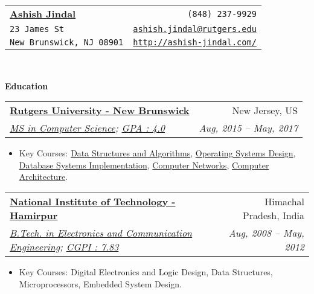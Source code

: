 \documentclass[letterpaper,11pt]{article}
\makeatletter
\newcommand{\resitem}[1]{\item #1 \vspace{2pt}}
\newcommand{\resheading}[1]{{\large \colorbox{mygrey}{\begin{minipage}{\textwidth}{\textbf{#1 \vphantom{p\^{E}}}}\end{minipage}}}\vspace{6pt}}
\newcommand{\ressubheading}[4]{
\begin{tabular*}{7in}{l@{\extracolsep{\fill}}r}
		\textbf{#1} & #2 \\
		\textit{#3} & \textit{#4} \\
\end{tabular*}\vspace{-3pt}}
\makeatother
\begin{document}
\newcommand{\mywebheader}{
\begin{tabular*}{7in}{l@{\extracolsep{\fill}}r}
	\textbf{\href{http://www.ashish-jindal.com/}{\LARGE Ashish Jindal}} & {\footnotesize \texttt{(848) 237-9929}}\\
	{\footnotesize \texttt{23 James St}} & {\footnotesize \texttt{\href{mailto:ashish.jindal@rutgers.edu}{ashish.jindal@rutgers.edu}}}\\
	 {\footnotesize \texttt{New Brunswick, NJ 08901}} & {\footnotesize \texttt{\href{http://www.ashish-jindal.com/}{http://ashish-jindal.com/}}} \\
	\end{tabular*}
\\
\vspace{0.1in}}

\mywebheader

\resheading{Education}
			\ressubheading{\href{http://www.rutgers.edu/}{Rutgers University - New Brunswick}}{New Jersey, US}{\href{https://www.cs.rutgers.edu/}{MS in Computer Science}; \href{http://www.ashish-jindal.com/rutgers_unofficial_transcript.pdf}{GPA : 4.0}}{Aug, 2015 -- May, 2017}
				{ \footnotesize
				\begin{itemize}
					\resitem{Key Courses: \href{https://www.cs.rutgers.edu/graduate/courses/512/}{Data Structures and Algorithms}, \href{https://www.cs.rutgers.edu/graduate/courses/518/}{Operating Systems Design}, \href{https://www.cs.rutgers.edu/graduate/courses/539/}{Database Systems Implementation}, \href{https://www.cs.rutgers.edu/graduate/courses/552/}{Computer Networks}, \href{https://www.cs.rutgers.edu/graduate/courses/505/}{Computer Architecture}.}
				\end{itemize}
				}


			\ressubheading{\href{http://www.nith.ac.in/}{National Institute of Technology - Hamirpur}}{Himachal Pradesh, India}{\href{http://www.nith.ac.in/ece/}{B.Tech. in Electronics and Communication Engineering}; \href{http://www.ashish-jindal.com/nith_unofficial_transcript.pdf}{CGPI : 7.83}}{Aug, 2008 -- May, 2012}
				{ \footnotesize
				\begin{itemize}
					\resitem{Key Courses: Digital Electronics and Logic Design, Data Structures, Microprocessors, Embedded System Design.}
					
				\end{itemize}
				}
\end{document}
